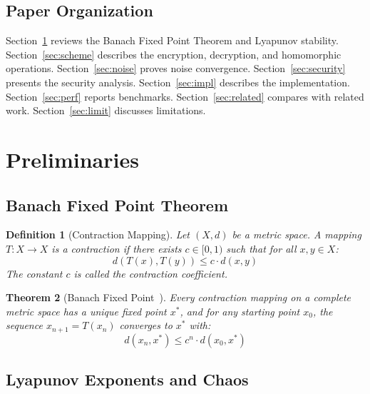 \documentclass[11pt,a4paper]{article}
\newtheorem{theorem}{Theorem}[section]
\newtheorem{definition}[theorem]{Definition}
\begin{document}
\subsection{Paper Organization}

Section~\ref{sec:prelim} reviews the Banach Fixed Point Theorem and Lyapunov stability. Section~\ref{sec:scheme} describes the encryption, decryption, and homomorphic operations. Section~\ref{sec:noise} proves noise convergence. Section~\ref{sec:security} presents the security analysis. Section~\ref{sec:impl} describes the implementation. Section~\ref{sec:perf} reports benchmarks. Section~\ref{sec:related} compares with related work. Section~\ref{sec:limit} discusses limitations.

\section{Preliminaries}
\label{sec:prelim}

\subsection{Banach Fixed Point Theorem}

\begin{definition}[Contraction Mapping]
Let $(X,d)$ be a metric space. A mapping $T: X \to X$ is a \textit{contraction} if there exists $c \in [0,1)$ such that for all $x,y \in X$:
\begin{equation}
    d(T(x), T(y)) \leq c \cdot d(x,y)
\end{equation}
The constant $c$ is called the \textit{contraction coefficient}.
\end{definition}

\begin{theorem}[Banach Fixed Point~\cite{banach1922}]
Every contraction mapping on a complete metric space has a unique fixed point $x^*$, and for any starting point $x_0$, the sequence $x_{n+1} = T(x_n)$ converges to $x^*$ with:
\begin{equation}
    d(x_n, x^*) \leq c^n \cdot d(x_0, x^*)
\end{equation}
\end{theorem}

\subsection{Lyapunov Exponents and Chaos}
\end{document}
